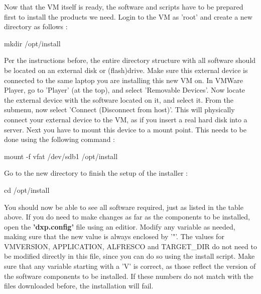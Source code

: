 \begin{myindent}
Now that the VM itself is ready, the software and scripts have to be prepared first to install the products we need.
Login to the VM as 'root' and create a new directory as follows :
\newline

\begin{urlboxstyle}
mkdir /opt/install
\end{urlboxstyle}
\newline

\noindent Per the instructions before, the entire directory structure with all software should be located on an external disk or (flash)drive. Make sure this external device is connected to the same laptop you
are installing this new VM on. In VMWare Player, go to 'Player' (at the top), and select 'Removable Devices'. Now locate the external device with the software located on it, and select it. From the submenu,
now select 'Connect (Disconnect from host)'. This will physically connect your external device to the VM, as if you insert a real hard disk into a server.
Next you have to mount this device to a mount point. This needs to be done using the following command :
\newline

\begin{urlboxstyle}
mount -f vfat /dev/sdb1 /opt/install
\end{urlboxstyle}
\newline

\noindent Go to the new directory to finish the setup of the installer :
\newline

\begin{urlboxstyle}
cd /opt/install
\end{urlboxstyle}
\newline

\noindent You should now be able to see all software required, just as listed in the table above. If you do need to make changes as far as the components to be installed, open the \textbf{'dxp.config'} file using an editior.
Modify any variable as needed, making sure that the new value is always enclosed by '"'.
The values for VMVERSION, APPLICATION, ALFRESCO and TARGET\_DIR do not need to be modified directly in this file, since you can do so using the install script.
Make sure that any variable starting with a 'V' is correct, as those reflect the version of the software components to be installed. If these numbers do not match with the files downloaded before, 
the installation will fail.
\newline


\end{myindent}
